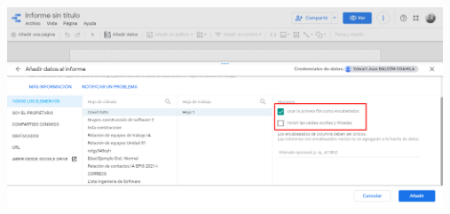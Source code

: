 \documentclass{article}
\begin{document}
\begin{enumerate}[\tab 1.]
        \begin{center}
            \includegraphics[width=13cm]{./images/9.png}
        \end{center}
        
    \end{enumerate}
    \newpage
\end{document}
